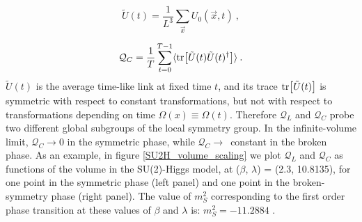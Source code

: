\begin{equation}
\tilde U(t) = \frac{1}{L^3} \sum_{\vec x} U_{0}(\vec x,t) \: ,
\end{equation}

\begin{equation}
\mathcal Q_C = \frac{1}{T} \sum_{t=0}^{T-1} \langle \tr [\tilde U(t) \tilde U(t)^{\dagger}] \rangle \: .
\end{equation}
%
$\tilde U(t)$ is the average time-like link at fixed time $t$, and its trace $\tr [\tilde U(t)]$ is symmetric with respect to constant transformations, but not with respect to transformations depending on time $\Omega (x) \equiv \Omega (t)$. Therefore $\mathcal Q_L$ and $\mathcal Q_C$ probe two different global subgroups of the local symmetry group. In the infinite-volume limit, $\mathcal Q_C \to 0$ in the symmetric phase, while $\mathcal Q_C \to$~constant in the broken phase. As an example, in figure \ref{SU2H_volume_scaling} we plot $\mathcal Q_L$ and $\mathcal Q_C$ as functions of the volume in the SU(2)-Higgs model, at ($\beta$, $\lambda$) = (2.3, 10.8135), for one point in the symmetric phase (left panel) and one point in the broken-symmetry phase (right panel). The value of $m_S^2$ corresponding to the first order phase transition at these values of $\beta$ and $\lambda$ is: $m_S^2 = -11.2884$ \cite{Langguth:1985eu}.


